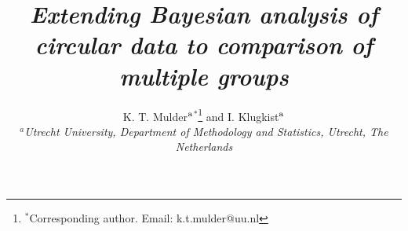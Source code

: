 \documentclass[]{gSCS2e}
\theoremstyle{plain}
\theoremstyle{definition}
\theoremstyle{remark}
\begin{document}
%

%
%
%


\title{{\itshape{Extending Bayesian analysis of circular data to comparison of multiple groups} }}

\author{K. T. Mulder$^{\rm a}$$^{\ast}$\thanks{$^\ast$Corresponding author. Email: k.t.mulder@uu.nl
\vspace{6pt}} and I. Klugkist$^{\rm a}$\\\vspace{6pt}  $^{a}${\em{Utrecht University, Department of Methodology and Statistics, Utrecht, The Netherlands}}\\ }

%
%

\maketitle
\end{document}
